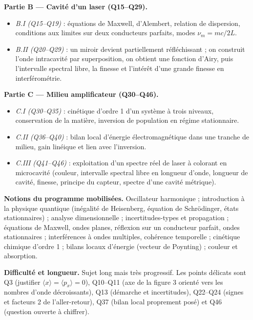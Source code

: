 \documentclass[11pt,a4paper]{article}
\providecommand{\tightlist}{\setlength{\itemsep}{0pt}\setlength{\parskip}{0pt}}
\begin{document}
\textbf{Partie B --- Cavité d'un laser (Q15--Q29).}

\begin{itemize}
\tightlist
\item
  \emph{B.I (Q15--Q19)} : équations de Maxwell, d'Alembert, relation de dispersion, conditions aux limites sur deux conducteurs parfaits, modes \(\nu_m=mc/2L\).
\item
  \emph{B.II (Q20--Q29)} : un miroir devient partiellement réfléchissant ; on construit l'onde intracavité par superposition, on obtient une fonction d'Airy, puis l'intervalle spectral libre, la finesse et l'intérêt d'une grande finesse en interférométrie.
\end{itemize}

\textbf{Partie C --- Milieu amplificateur (Q30--Q46).}

\begin{itemize}
\tightlist
\item
  \emph{C.I (Q30--Q35)} : cinétique d'ordre 1 d'un système à trois niveaux, conservation de la matière, inversion de population en régime stationnaire.
\item
  \emph{C.II (Q36--Q40)} : bilan local d'énergie électromagnétique dans une tranche de milieu, gain linéique et lien avec l'inversion.
\item
  \emph{C.III (Q41--Q46)} : exploitation d'un spectre réel de laser à colorant en microcavité (couleur, intervalle spectral libre en longueur d'onde, longueur de cavité, finesse, principe du capteur, spectre d'une cavité métrique).
\end{itemize}

\textbf{Notions du programme mobilisées.} Oscillateur harmonique ; introduction à la physique quantique (inégalité de Heisenberg, équation de Schrödinger, états stationnaires) ; analyse dimensionnelle ; incertitudes-types et propagation ; équations de Maxwell, ondes planes, réflexion sur un conducteur parfait, ondes stationnaires ; interférences à ondes multiples, cohérence temporelle ; cinétique chimique d'ordre 1 ; bilans locaux d'énergie (vecteur de Poynting) ; couleur et absorption.

\textbf{Difficulté et longueur.} Sujet long mais très progressif. Les points délicats sont Q3 (justifier \(\langle x\rangle=\langle p_x\rangle=0\)), Q10--Q11 (axe de la figure 3 orienté vers les nombres d'onde décroissants), Q13 (démarche et incertitudes), Q22--Q24 (signes et facteurs 2 de l'aller-retour), Q37 (bilan local proprement posé) et Q46 (question ouverte à chiffrer).
\end{document}
